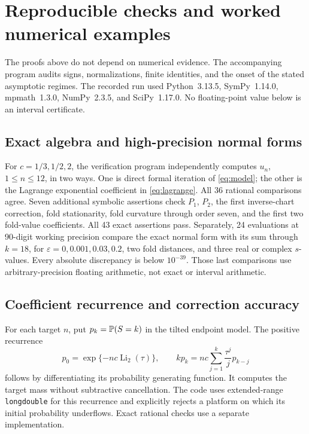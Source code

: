 \documentclass[11pt,a4paper]{article}
\numberwithin{equation}{section}
\theoremstyle{definition}
\theoremstyle{remark}
\DeclareMathOperator{\Li}{Li}
\newcommand{\ep}{\varepsilon}\newcommand{\la}{\lambda}
\begin{document}
\section{Reproducible checks and worked numerical examples}
\label{sec:verification}
The proofs above do not depend on numerical evidence. The accompanying
program audits signs, normalizations, finite identities, and the onset
of the stated asymptotic regimes. The recorded run used Python~3.13.5,
SymPy~1.14.0, mpmath~1.3.0, NumPy~2.3.5, and SciPy~1.17.0.
No floating-point value below is an interval certificate.

\subsection{Exact algebra and high-precision normal forms}
For \(c=1/3,1/2,2\), the verification program independently computes
\(u_n\), \(1\le n\le12\), in two ways. One is direct formal iteration of
\eqref{eq:model}; the other is the Lagrange exponential coefficient in
\eqref{eq:lagrange}. All 36 rational comparisons agree.
Seven additional symbolic assertions check \(P_1\), \(P_2\), the first
inverse-chart correction, fold stationarity, fold curvature through
order seven, and the first two fold-value coefficients. All 43 exact
assertions pass. Separately, 24 evaluations at 90-digit working precision
compare the exact normal form with its sum through \(k=18\), for
\(\ep=0,0.001,0.03,0.2\), two fold distances, and three real or complex
\(s\)-values. Every absolute discrepancy is below \(10^{-39}\).
Those last comparisons use arbitrary-precision floating arithmetic,
not exact or interval arithmetic.

\subsection{Coefficient recurrence and correction accuracy}
For each target \(n\), put
\(p_k=\mathbb P(S=k)\) in the tilted endpoint model. The positive recurrence
\begin{equation}\label{eq:p-rec}
 p_0=\exp\{-nc\Li_2(\tau)\},\qquad
 kp_k=nc\sum_{j=1}^k\frac{\tau^j}{j}p_{k-j}
\end{equation}
follows by differentiating its probability generating function.
It computes the target mass without subtractive cancellation.
The code uses extended-range \texttt{longdouble} for this recurrence
and explicitly rejects a platform on which its initial probability
underflows. Exact rational checks use a separate implementation.
\end{document}
